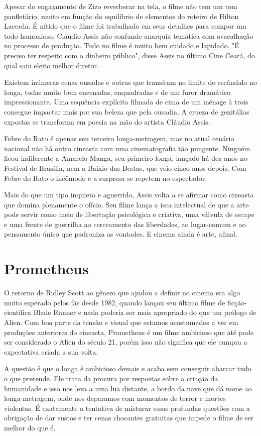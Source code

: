 \documentclass[a4paper,11pt,openright,openbib]{article}
\begin{document}
Apesar do engajamento de Zizo reverberar na tela, o filme não tem um tom panfletário, muito em função do equilíbrio de elementos do roteiro de Hilton Lacerda. É nítido que o filme foi trabalhado em seus detalhes para compor um todo hamonioso. Cláudio Assis não confunde anarquia temática com avacalhação no processo de produção. Tudo no filme é muito bem cuidado e lapidado. "É preciso ter respeito com o dinheiro público", disse Assis no último Cine Ceará, do qual saiu eleito melhor diretor. 

Existem inúmeras cenas ousadas e outras que transitam no limite do escândalo no longa, todas muito bem encenadas, enquadradas e de um furor dramático impressionante. Uma sequência explícita filmada de cima de um ménage à trois consegue impactar mais por sua beleza que pela ousadia. A crueza de genitálias expostas se transforma em poesia na mão do artista Cláudio Assis. 

Febre do Rato é apenas seu terceiro longa-metragem, mas no atual cenário nacional não há outro cineasta com uma cinematografia tão pungente. Ninguém ficou indiferente a Amarelo Manga, seu primeiro longa, lançado há dez anos no Festival de Brasília, nem a Baixio das Bestas, que veio cinco anos depois. Com Febre do Rato o incômodo e a surpresa se repetem no espectador. 

Mais do que um tipo inquieto e aguerrido, Assis volta a se afirmar como cineasta que domina plenamente o ofício. Seu filme lança a isca intelectual de que a arte pode servir como meio de libertação psicológica e criativa, uma válvula de escape e uma frente de guerrilha ao cerceamento das liberdades, ao lugar-comum e ao pensamento único que padroniza as vontades. E cinema ainda é arte, afinal. 

\section{Prometheus}
O retorno de Ridley Scott ao gênero que ajudou a definir no cinema era algo muito esperado pelos fãs desde 1982, quando lançou seu último filme de ficção-científica Blade Runner e nada poderia ser mais apropriado do que um prólogo de Alien. Com boa parte da tensão e visual que estamos acostumados a ver em produções anteriores do cineasta, Prometheus é um filme ambicioso que até pode ser considerado o Alien do século 21, porém isso não significa que ele cumpra a expectativa criada a sua volta.

A questão é que o longa é ambicioso demais e acaba sem conseguir abarcar tudo o que pretende. Ele trata da procura por respostas sobre a criação da humanidade e isso nos leva a uma lua distante, a bordo da nave que dá nome ao longa-metragem, onde nos deparamos com momentos de terror e mortes violentas. É exatamente a tentativa de misturar essas profundas questões com a obrigação de dar sustos e ter cenas chocantes gratuitas que impede o filme de ser melhor do que é.
\end{document}
